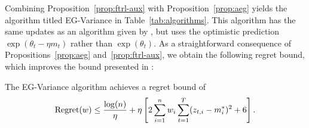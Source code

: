 \documentclass[paper_icml.tex]{subfiles}
\begin{document}
Combining Proposition~\ref{prop:ftrl-aux} with Proposition~\ref{prop:aeg} yields 
the algorithm titled EG-Variance in Table~\ref{tab:algorithms}. This algorithm has the 
same updates as an algorithm given by \cite{hazan2010variation}, but uses the 
optimistic prediction $\exp(\theta_t - \eta m_t)$ rather than $\exp(\theta_t)$. 
As a straightforward consequence of Propositions~\ref{prop:aeg} and~\ref{prop:ftrl-aux}, we 
obtain the following regret bound, which improves the bound presented in 
\cite{hazan2010variation}:
\begin{corollary}
\label{cor:EG-variance}
The EG-Variance algorithm achieves a regret bound of
\begin{equation*}\operatorname{Regret}(w) \leq \frac{\log(n)}{\eta} + \eta \left[ 2\sum_{i=1}^n w_i \sum_{t=1}^T (z_{t,i} - m_i^*)^2 + 6 \right].\end{equation*} 
\end{corollary}
\end{document}
